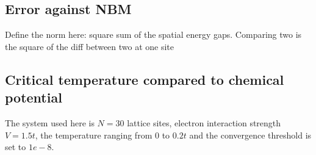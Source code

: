 \documentclass[11pt]{article}
\begin{document}
\subsection{Error against NBM} %
\label{sub:error_against_nbm}

Define the norm here: square sum of the spatial energy gaps. Comparing two is the square of the diff between two at one site





\subsection{Critical temperature compared to chemical potential}
The system used here is $N = 30$ lattice sites, electron interaction strength $V=1.5t$, the temperature ranging from $0$ to $0.2t$ and the convergence threshold is set to $1e-8$. 
\end{document}

